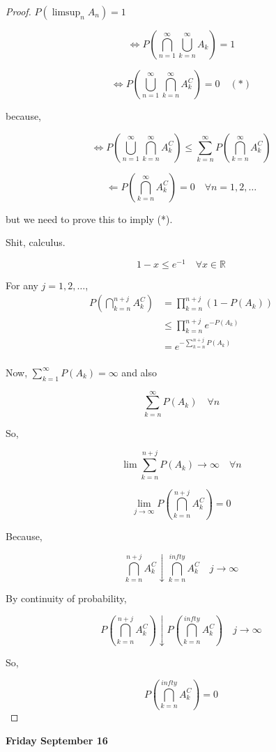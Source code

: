 \documentclass[11pt,fleqn]{book} %
\begin{document}
\begin{proof}
	$P(\limsup_n A_n) = 1$

	$$\Leftrightarrow P(\bigcap ^\infty_{n=1} \bigcup^\infty_{k=n} A_k) = 1 $$

	$$\Leftrightarrow P(\bigcup^\infty_{n=1} \bigcap^\infty_{k=n} A^C_k) = 0 \quad (*)$$

	because, 

	$$\Leftrightarrow P(\bigcup^\infty_{n=1} \bigcap^\infty_{k=n} A^C_k) \leq \displaystyle \sum^\infty_{k=n} P(\bigcap^\infty_{k=n} A_k^C )  $$

	$$\Leftarrow P(\bigcap^\infty_{k=n} A_k^C ) = 0 \quad \forall n = 1, 2, \dots $$

	but we need to prove this to imply (*). 

	Shit, calculus. 

	$$1 - x \leq e^{-1} \quad \forall x \in \mathbb{R} $$


	For any $j = 1, 2, \dots$, 
	\begin{align*}
		P\left( \bigcap ^{n+j}_{k=n} A_k^C \right) &= \prod^{n+j}_{k=n} (1 - P(A_k))\\
			&\leq \prod^{n+j}_{k=n} e^{-P(A_k)}\\
			&= e^{- \sum^{n+j}_{k=n} P(A_k)}\\
	\end{align*}

	Now,  $\sum^{\infty}_{k=1} P(A_k) = \infty$ and also

	$$ \sum^{\infty}_{k=n} P(A_k) \quad \forall n $$

	So, 

	$$\lim \sum^{n+j}_{k=n} P(A_k) \rightarrow \infty \quad \forall n$$

	$$\lim_{j \rightarrow \infty} P\left(\bigcap ^{n+j}_{k=n} A_k^C \right) = 0 $$

	Because, 

	$$\bigcap ^{n+j}_{k=n} A_k^C \downarrow \bigcap ^{infty}_{k=n} A_k^C \quad j \rightarrow \infty $$

	By continuity of probability, 

	$$ P\left(\bigcap ^{n+j}_{k=n} A_k^C \right) \downarrow P\left(\bigcap ^{infty}_{k=n} A_k^C \right)\quad j \rightarrow \infty$$

	So, 

	$$P\left(\bigcap ^{infty}_{k=n} A_k^C \right) = 0 $$

\end{proof}

\textbf{Friday September 16}\\
\end{document}
